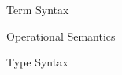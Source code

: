 \documentclass{article}
\begin{document}
\begin{figure}[]
  \centering
  
  \caption{\EEFF Term Syntax}
\end{figure}

\begin{figure}[]
  \centering
  
  \caption{\EEFF Operational Semantics}
\end{figure}

\begin{figure}[]
  \centering
  
  \caption{\EEFF Type Syntax}
\end{figure}
\end{document}
